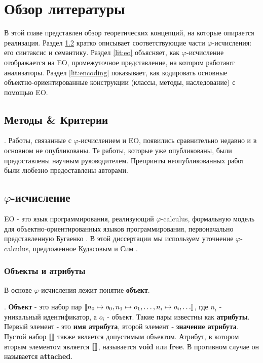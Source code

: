 \chapter{Обзор литературы}
\label{chap:lr}
В этой главе представлен обзор теоретических концепций, на которые опирается реализация. Раздел \ref{lit:phicalc} кратко описывает соответствующие части $\varphi$-исчисления: его синтаксис и семантику. Раздел \ref{lit:eo} объясняет, как $\varphi$-исчисление отображается на EO, промежуточное представление, на котором работают анализаторы. Раздел \ref{lit:encoding} показывает, как кодировать основные объектно-ориентированные конструкции (классы, методы, наследование) с помощью EO. 

\section{Методы \& Критерии}.
Работы, связанные с $\varphi$-исчислением и EO, появились сравнительно недавно и в основном не опубликованы. Те работы, которые уже опубликованы, были предоставлены научным руководителем. Препринты неопубликованных работ были любезно предоставлены авторами. 

\section{$\varphi$-исчисление}
\label{lit:phicalc}

EO - это язык программирования, реализующий $\varphi$-calculus, формальную модель для объектно-ориентированных языков программирования, первоначально представленную Бугаенко \cite{eolang}. В этой диссертации мы используем уточнение $\varphi$-calculus, предложенное Кудасовым и Сим \cite{kudasov}.

\subsection{Объекты и атрибуты}
В основе $\varphi$-исчисления лежит понятие \textbf{объект}.

\begin{definition}.
    \textbf{Объект} - это набор пар $\llbracket n_0 \mapsto o_0, n_1 \mapsto o_1, \hdots, n_i \mapsto o_i, \hdots \rrbracket$, где $n_i$ - уникальный идентификатор, а $o_i$ - объект. Такие пары известны как \textbf{атрибуты}. Первый элемент - это \textbf{имя атрибута}, второй элемент - \textbf{значение атрибута}. Пустой набор $\llbracket  \rrbracket$ также является допустимым объектом. Атрибут, в котором вторым элементом является $\llbracket  \rrbracket$, называется \textbf{void} или \textbf{free}. В противном случае он называется \textbf{attached}.
\end{definition}

